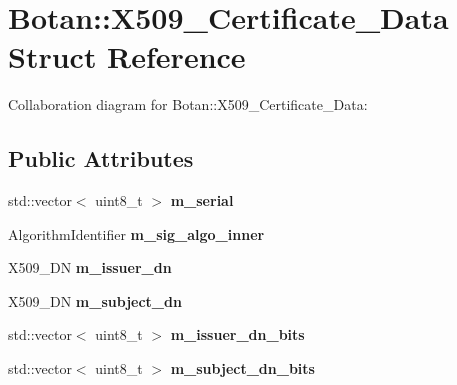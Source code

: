 \hypertarget{struct_botan_1_1_x509___certificate___data}{}\section{Botan\+:\+:X509\+\_\+\+Certificate\+\_\+\+Data Struct Reference}
\label{struct_botan_1_1_x509___certificate___data}


Collaboration diagram for Botan\+:\+:X509\+\_\+\+Certificate\+\_\+\+Data\+:
\subsection*{Public Attributes}
\begin{DoxyCompactItemize}
\item 
\mbox{\label{struct_botan_1_1_x509___certificate___data_ae516d65d361623a7353902e4aabc3b5d}} 
std\+::vector$<$ uint8\+\_\+t $>$ {\bfseries m\+\_\+serial}
\item 
\mbox{\label{struct_botan_1_1_x509___certificate___data_adfc44c0449f6e67df45493c66471b0ed}} 
Algorithm\+Identifier {\bfseries m\+\_\+sig\+\_\+algo\+\_\+inner}
\item 
\mbox{\label{struct_botan_1_1_x509___certificate___data_a93806877a2df92618f4ce56ffe8f1b0e}} 
X509\+\_\+\+DN {\bfseries m\+\_\+issuer\+\_\+dn}
\item 
\mbox{\label{struct_botan_1_1_x509___certificate___data_a73525340590a70d9e7989996e23dbef5}} 
X509\+\_\+\+DN {\bfseries m\+\_\+subject\+\_\+dn}
\item 
\mbox{\label{struct_botan_1_1_x509___certificate___data_ace7d08751c471e211919fb54c2e06de8}} 
std\+::vector$<$ uint8\+\_\+t $>$ {\bfseries m\+\_\+issuer\+\_\+dn\+\_\+bits}
\item 
\mbox{\label{struct_botan_1_1_x509___certificate___data_ac154d6f13ad3137ae3e909a752eea92e}} 
std\+::vector$<$ uint8\+\_\+t $>$ {\bfseries m\+\_\+subject\+\_\+dn\+\_\+bits}
\item 

\end{DoxyCompactItemize}
